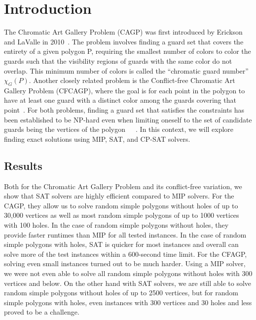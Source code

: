 \chapter{Introduction}
The Chromatic Art Gallery Problem (CAGP) was first introduced by Erickson and LaValle in 2010~\cite{erickson2010chromatic}. The problem involves finding a guard set that covers the entirety of a given polygon P, requiring the smallest number of colors to color the guards such that the visibility regions of guards with the same color do not overlap. This minimum number of colors is called the ``chromatic guard number'' $\chi_G(P)$. Another closely related problem is the Conflict-free Chromatic Art Gallery Problem (CFCAGP), where the goal is for each point in the polygon to have at least one guard with a distinct color among the guards covering that point~\cite{bartschi2014conflict}. For both problems, finding a guard set that satisfies the constraints has been established to be NP-hard even when limiting oneself to the set of candidate guards being the vertices of the polygon~\cite{fekete2014chromatic}~\cite{erickson2011many}~\cite{iwamoto2022vertex}. In this context, we will explore finding exact solutions using MIP, SAT, and CP-SAT solvers.

\section{Results}
Both for the Chromatic Art Gallery Problem and its conflict-free variation, we show that SAT solvers are highly efficient compared to MIP solvers. For the CAGP, they allow us to solve random simple polygons without holes of up to 30,000 vertices as well as most random simple polygons of up to 1000 vertices with 100 holes. In the case of random simple polygons without holes, they provide faster runtimes than MIP for all tested instances. In the case of random simple polygons with holes, SAT is quicker for most instances and overall can solve more of the test instances within a 600-second time limit.
For the CFAGP, solving even small instances turned out to be much harder.
Using a MIP solver, we were not even able to solve all random simple polygons without holes with 300 vertices and below. On the other hand with SAT solvers, we are still able to solve random simple polygons without holes of up to 2500 vertices, but for random simple polygons with holes, even instances with 300 vertices and 30 holes and less proved to be a challenge. 

